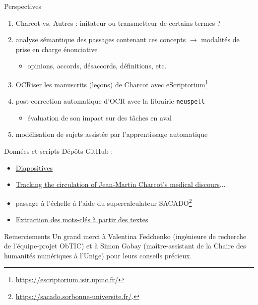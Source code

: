\begin{frame}{Perspectives}
    \begin{enumerate}
        \item Charcot vs. Autres : initateur ou transmetteur de certains termes ?
        \item analyse sémantique des passages contenant ces concepts $\rightarrow{}$ modalités de prise en charge énonciative
        \begin{itemize}
            \item opinions,
accords, désaccords, définitions, etc.
        \end{itemize}
        \item \textsc{OCR}iser les manuscrits (\og{}leçons\fg{}) de Charcot avec eScriptorium\footnote{\url{https://escriptorium.isir.upmc.fr/}}
        \item post-correction automatique d'\textsc{OCR} avec la librairie \texttt{neuspell}
		\begin{flushright}
		\vspace{-0.2cm}
	{\footnotesize\citep{jayanthi2020neuspell}}	
	\end{flushright}		       
        \begin{itemize}
        \item évaluation de son impact sur des tâches en aval 
        \end{itemize}
        \item modélisation de sujets assistée par l'apprentissage automatique
        \begin{flushright}
        \vspace{-0.2cm}
        {\footnotesize\citep{grootendorst2022bertopic}}
		\end{flushright}         
    \end{enumerate}
\end{frame}

\begin{frame}{Données et scripts}
Dépôts GitHub :
\begin{itemize}
\item \href{https://github.com/ljpetkovic/Seminaire_doctoral_CERES_270324/settings}{Diapositives}
\item \href{https://github.com/ljpetkovic/Charcot_circulations}{Tracking the circulation of Jean-Martin Charcot’s medical discours$\dots$}
\item passage à l'échelle à l'aide du supercalculateur \textsc{SACADO}\footnote{\url{https://sacado.sorbonne-universite.fr/}.}
\item \href{https://github.com/ljpetkovic Charcot_KeyBERT_Keyphrase-Vectorizers}{Extraction des mots-clés à partir des textes}
\end{itemize}
\end{frame}

\begin{frame}{Remerciements}
\justifying
Un grand merci à Valentina Fedchenko (ingénieure de recherche de l'équipe-projet ObTIC) et à Simon Gabay (maître-assistant de la Chaire des humanités numériques à l'Unige) pour leurs conseils précieux.
\end{frame}